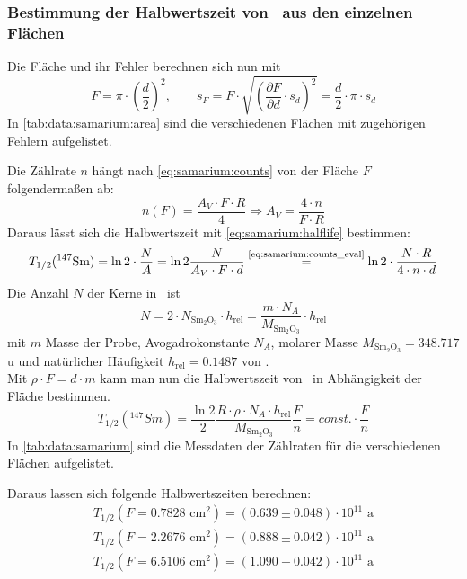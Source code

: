 \subsubsection{Bestimmung der Halbwertszeit von \samarium ~aus den einzelnen Flächen}
Die Fläche und ihr Fehler berechnen sich nun mit
\begin{equation}
  F = \pi  \cdot \left( \frac{d}{2} \right)^2 , \qquad 
  s_F = F \cdot \sqrt{ \left( \frac{\partial F}{\partial d} \cdot s_d \right)^2 } = \frac{d}{2} \cdot \pi \cdot s_d
\end{equation}
In \autoref{tab:data:samarium:area} sind die verschiedenen Flächen mit zugehörigen Fehlern aufgelistet.

Die Zählrate $n$ hängt nach \autoref{eq:samarium:counts} von der Fläche $F$ folgendermaßen ab:
\begin{equation}
\label{eq:samarium:counts_eval}
  n(F) = \frac{A_V \cdot F \cdot R}{4} \Rightarrow A_V = \frac{4 \cdot n}{F \cdot R}
\end{equation}
Daraus lässt sich die Halbwertszeit mit \autoref{eq:samarium:halflife} bestimmen:
\begin{equation}
  T_{1/2}({}^{147}\text{Sm}) = \ln 2 \cdot \frac{N}{A} = \ln 2 \frac{N}{A_V \cdot F \cdot d} \overset{\text{\eqref{eq:samarium:counts_eval}}}{=} 
  \ln 2 \cdot \frac{N \cdot R}{4 \cdot n \cdot d}
\end{equation}
Die Anzahl $N$ der Kerne in \samarium\, ist
\begin{equation}
  N = 2 \cdot N_{\text{Sm}_2\text{O}_3} \cdot h_{\text{rel}} = \frac{m \cdot N_A}{M_{\text{Sm}_2\text{O}_3}} \cdot h_{\text{rel}}
\end{equation}
mit $m$ Masse der Probe, Avogadrokonstante $N_A$, molarer Masse $M_{\text{Sm}_2\text{O}_3}=348.717$u und natürlicher Häufigkeit $h_{\text{rel}} = 0.1487$ von \samarium. \\
Mit $\rho \cdot F = d \cdot m$ kann man nun die Halbwertszeit von \samarium\, in Abhängigkeit der Fläche bestimmen.
\begin{equation}
  \label{eq:samarium:halflife_eval}
  T_{1/2}({}^{147}Sm) = \frac{\ln 2}{2} \frac{R \cdot \rho \cdot N_A \cdot h_{\text{rel}}}{M_{\text{Sm}_2\text{O}_3}} \frac{F}{n} = const. \cdot \frac{F}{n}
\end{equation}
In \autoref{tab:data:samarium} sind die Messdaten der Zählraten für die verschiedenen Flächen aufgelistet.

Daraus lassen sich folgende Halbwertszeiten berechnen:
\begin{gather}
  T_{1/2}(F=0.7828 \text{ cm}^2) = (0.639 \pm 0.048)\cdot 10^{11} \text{ a} \\
  T_{1/2}(F=2.2676 \text{ cm}^2) = (0.888 \pm 0.042)\cdot 10^{11} \text{ a}\\
  T_{1/2}(F=6.5106 \text{ cm}^2) = (1.090 \pm 0.042)\cdot 10^{11} \text{ a}
\end{gather}
